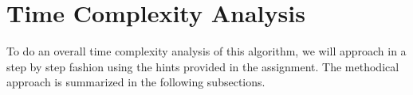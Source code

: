 \documentclass{article}
\begin{document}




\section {Time Complexity Analysis}
To do an overall time complexity analysis of this algorithm, we will approach in a step by step  fashion using the hints provided in the assignment. The methodical approach is summarized in the following subsections.
\end{document}
